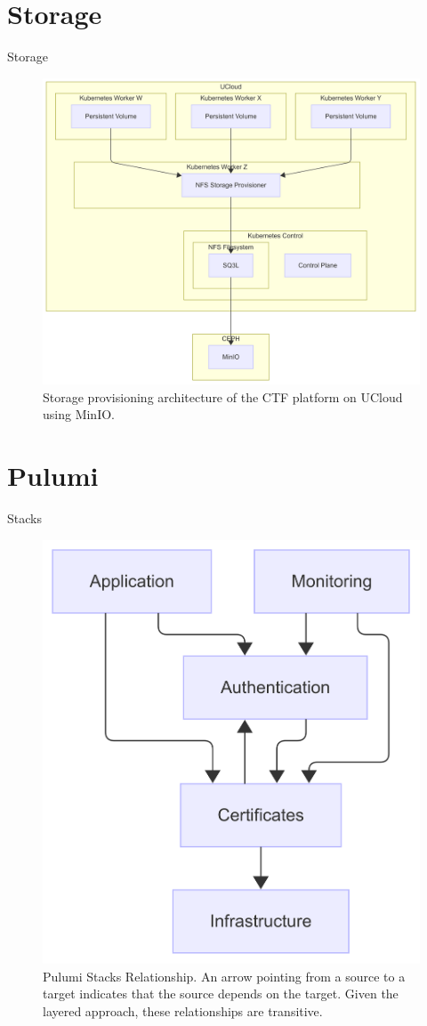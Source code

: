\documentclass{beamer}
\begin{document}
\section{Storage}
\begin{frame}{Storage}
    \begin{figure}
        \centering
        \includegraphics[width=.8\textwidth]{../report/images/storage-provisioner.png}
        \caption{Storage provisioning architecture of the CTF platform on UCloud using MinIO.}
    \end{figure}
\end{frame}

\section{Pulumi}
\begin{frame}{Stacks}
    \begin{figure}
        \centering
        \includegraphics[width=.45\textwidth]{./images/pulumi-stacks.png}
        \caption{Pulumi Stacks Relationship. An arrow pointing from a source to a target indicates that the source depends on the target. Given the layered approach, these relationships are transitive.}
    \end{figure}
\end{frame}
\end{document}
